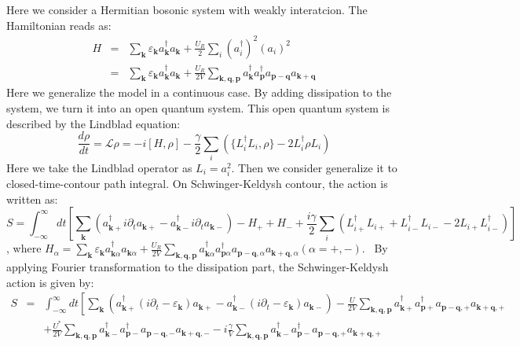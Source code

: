 \documentclass{article}
\newcommand{\tmmathbf}[1]{\ensuremath{\boldsymbol{#1}}}
\begin{document}
Here we consider a Hermitian bosonic system with weakly interatcion. The
Hamiltonian reads as:
\begin{eqnarray}
  H & = & \sum_{\tmmathbf{k}} \varepsilon_{\tmmathbf{k}}
  a_{\tmmathbf{k}}^{\dagger} a_{\tmmathbf{k}} + \frac{U_R}{2} \sum_i
  (a_i^{\dagger})^2 (a_i)^2 \nonumber\\
  & = & \sum_{\tmmathbf{k}} \varepsilon_{\tmmathbf{k}}
  a_{\tmmathbf{k}}^{\dagger} a_{\tmmathbf{k}} + \frac{U_R}{2 V}
  \sum_{\tmmathbf{k}, \tmmathbf{q}, \tmmathbf{p}} a_{\tmmathbf{k}}^{\dagger}
  a_{\tmmathbf{p}}^{\dagger} a_{\tmmathbf{p}-\tmmathbf{q}}
  a_{\tmmathbf{k}+\tmmathbf{q}} \label{Hamiltonian} 
\end{eqnarray}
Here we generalize the model in a continuous case. By adding dissipation to
the system, we turn it into an open quantum system. This open quantum system
is described by the Lindblad equation:
\begin{equation}
  \frac{d \rho}{d t} =\mathcal{L} \rho = - i [H, \rho] - \frac{\gamma}{2}
  \sum_i (\{ L_i^{\dagger} L_i, \rho \} - 2 L_i^{\dagger} \rho L_i)
  \label{Lindbland}
\end{equation}
Here we take the Lindblad operator as $L_i = a_i^2$. Then we consider
generalize it to closed-time-contour path integral. On Schwinger-Keldysh
contour, the action is written as:
\begin{equation}
  S = \int_{- \infty}^{\infty} d t \left[ \sum_{\tmmathbf{k}}
  (a^{\dagger}_{\tmmathbf{k}+} i \partial_t a_{\tmmathbf{k}+} -
  a^{\dagger}_{\tmmathbf{k}-} i \partial_t a_{\tmmathbf{k}-}) - H_+ + H_- +
  \frac{i \gamma}{2} \sum_i (L_{i +}^{\dagger} L_{i +} + L_{i -}^{\dagger}
  L_{i -} - 2 L_{i +} L_{i -}^{\dagger}) \right]
\end{equation}
, where $H_{\alpha} = \sum_{\tmmathbf{k}} \varepsilon_{\tmmathbf{k}}
a_{\tmmathbf{k} \alpha}^{\dagger} a_{\tmmathbf{k} \alpha} + \frac{U_R}{2 V}
\sum_{\tmmathbf{k}, \tmmathbf{q}, \tmmathbf{p}} a_{\tmmathbf{k}
\alpha}^{\dagger} a_{\tmmathbf{p} \alpha}^{\dagger}
a_{\tmmathbf{p}-\tmmathbf{q}, \alpha} a_{\tmmathbf{k}+\tmmathbf{q}, \alpha}
(\alpha = +, -)$. \ By applying Fourier transformation to the dissipation
part, the Schwinger-Keldysh action is given by:
\begin{eqnarray}
  S & = & \int_{- \infty}^{\infty} d t \left[ \sum_{\tmmathbf{k}}
  (a^{\dagger}_{\tmmathbf{k}+} (i \partial_t - \varepsilon_{\tmmathbf{k}})
  a_{\tmmathbf{k}+} - a^{\dagger}_{\tmmathbf{k}-} (i \partial_t -
  \varepsilon_{\tmmathbf{k}}) a_{\tmmathbf{k}-}) - \frac{U}{2 V}
  \sum_{\tmmathbf{k}, \tmmathbf{q}, \tmmathbf{p}} a_{\tmmathbf{k}+}^{\dagger}
  a_{\tmmathbf{p}+}^{\dagger} a_{\tmmathbf{p}-\tmmathbf{q}, +}
  a_{\tmmathbf{k}+\tmmathbf{q}, +} \right. \nonumber\\
  &  & + \frac{U^{\ast}}{2 V} \sum_{\tmmathbf{k}, \tmmathbf{q}, \tmmathbf{p}}
  a_{\tmmathbf{k}-}^{\dagger} a_{\tmmathbf{p}-}^{\dagger}
  a_{\tmmathbf{p}-\tmmathbf{q}, -} a_{\tmmathbf{k}+\tmmathbf{q}, -} - i
  \frac{\gamma}{V} \sum_{\tmmathbf{k}, \tmmathbf{q}, \tmmathbf{p}}
  a_{\tmmathbf{k}-}^{\dagger} a_{\tmmathbf{p}-}^{\dagger}
  a_{\tmmathbf{p}-\tmmathbf{q}, +} a_{\tmmathbf{k}+\tmmathbf{q}, +} 
\end{eqnarray}
\end{document}
